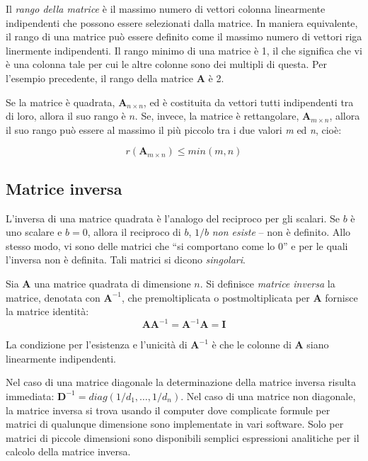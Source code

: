Il \emph{rango della matrice} {\`e} il massimo numero
    di vettori colonna linearmente indipendenti che possono essere
    selezionati dalla matrice.
 In maniera equivalente, il rango di una matrice pu{\`o}
    essere definito come il massimo numero di vettori riga linermente
    indipendenti.
 Il rango minimo di una matrice {\`e} 1, il che significa che vi {\`e}
     una colonna tale per cui le altre colonne sono dei multipli
     di questa. Per l'esempio precedente, il rango della matrice $\boldsymbol{A}$ {\`e} 2.

Se la matrice {\`e} quadrata, $\boldsymbol{A}_{n \times n}$, ed
{\`e} costituita da vettori tutti indipendenti tra di loro, allora
il suo rango {\`e} $n$.
Se, invece, la matrice {\`e} rettangolare, $\boldsymbol{A}_{m
\times n}$, allora il suo rango pu{\`o} essere al massimo il
pi{\`u} piccolo tra i due valori \emph{m} ed \emph{n}, cio{\`e}:

\[
  r(\boldsymbol{A}_{m \times n}) \leq min(m,n)
\]

\subsection{Matrice inversa}

 L'inversa di una matrice quadrata {\`e} l'analogo del reciproco per
     gli scalari.
Se $b$ {\`e} uno scalare e $b=0$, allora il reciproco di
     $b$, $1/b$ \emph{non esiste} -- non {\`e} definito. Allo stesso modo, vi sono delle matrici che ``si comportano come lo
     0'' e per le quali l'inversa non {\`e} definita. Tali matrici si dicono  \emph{singolari}.

Sia $\boldsymbol{A}$ una matrice quadrata di dimensione $n$.
Si definisce \emph{matrice inversa} la matrice,
 denotata con $\boldsymbol{A}^{-1}$, che premoltiplicata o postmoltiplicata per
 $\boldsymbol{A}$
fornisce la matrice identit{\`a}:
     \[
         \boldsymbol{A}\boldsymbol{A}^{-1}=\boldsymbol{A}^{-1}\boldsymbol{A}=\boldsymbol{I}
     \]

 La condizione per l'esistenza e l'unicit{\`a} di
$\boldsymbol{A}^{-1}$ {\`e} che le colonne di $\boldsymbol{A}$
siano linearmente indipendenti.

 Nel caso di una matrice diagonale la determinazione della matrice inversa risulta
     immediata: $\boldsymbol{D}^{-1}= diag(1/d_1, \dots, 1/d_n)$.
 Nel caso di una matrice non diagonale, la matrice inversa si trova usando il computer
     dove complicate formule per matrici di qualunque dimensione
     sono implementate in vari software.
 Solo per matrici di piccole dimensioni sono disponibili semplici
     espressioni analitiche per il calcolo della matrice inversa.
     
